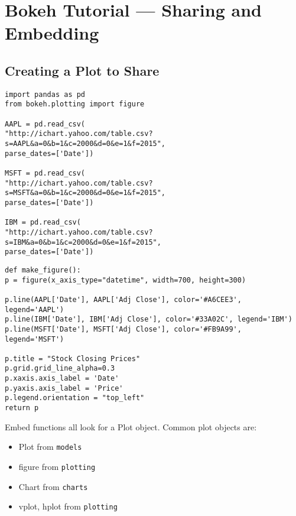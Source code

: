 \documentclass[a4paper,12pt]{article}
\begin{document}
\section{Bokeh Tutorial — Sharing and Embedding}
\subsection{Creating a Plot to Share}
\begin{framed}
\begin{verbatim}
import pandas as pd
from bokeh.plotting import figure

AAPL = pd.read_csv(
"http://ichart.yahoo.com/table.csv?s=AAPL&a=0&b=1&c=2000&d=0&e=1&f=2015",
parse_dates=['Date'])

MSFT = pd.read_csv(
"http://ichart.yahoo.com/table.csv?s=MSFT&a=0&b=1&c=2000&d=0&e=1&f=2015",
parse_dates=['Date'])

IBM = pd.read_csv(
"http://ichart.yahoo.com/table.csv?s=IBM&a=0&b=1&c=2000&d=0&e=1&f=2015",
parse_dates=['Date'])
\end{verbatim}
\end{framed}

\begin{framed}
	\begin{verbatim}
def make_figure():
p = figure(x_axis_type="datetime", width=700, height=300)

p.line(AAPL['Date'], AAPL['Adj Close'], color='#A6CEE3', legend='AAPL')
p.line(IBM['Date'], IBM['Adj Close'], color='#33A02C', legend='IBM')
p.line(MSFT['Date'], MSFT['Adj Close'], color='#FB9A99', legend='MSFT')

p.title = "Stock Closing Prices"
p.grid.grid_line_alpha=0.3
p.xaxis.axis_label = 'Date'
p.yaxis.axis_label = 'Price'
p.legend.orientation = "top_left"
return p
\end{verbatim}
\end{framed}

Embed functions all look for a Plot object. Common plot objects are:

\begin{itemize}
\item Plot from \texttt{models}
\item figure from \texttt{plotting}
\item Chart from \texttt{charts}
\item vplot, hplot from \texttt{plotting}
\end{itemize}
\end{document}
